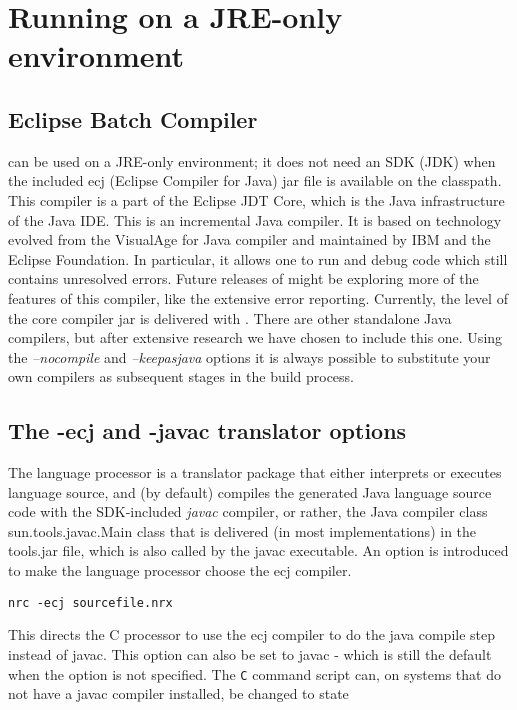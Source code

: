 \chapter{Running on a JRE-only environment\label{nosdk}}
 
\section{Eclipse Batch Compiler}
\nr{} can be used on a JRE-only environment; it  does not need an SDK (JDK) when the included ecj (Eclipse Compiler for Java) jar file is available on the classpath. This compiler is a part of the Eclipse JDT Core, which is the Java infrastructure of the Java IDE. This is an incremental Java compiler. It is based on technology evolved from the VisualAge for Java compiler and maintained by IBM and the Eclipse Foundation. In particular, it allows one to run and debug code which still contains unresolved errors. Future releases of \nr{} might be exploring more of the features of this compiler, like the extensive error reporting. Currently, the \ecjjarname{} level of the core compiler jar is delivered with \nr{}. There are other standalone Java compilers, but after extensive research we have chosen to include this one. Using the \emph{–nocompile} and \emph{–keepasjava} options it is always possible to substitute your own compilers as subsequent stages in the build process.
 
\section{The -ecj and -javac translator options}
The \nr{} language processor is a translator package that either interprets or executes \nr{} language source, and (by default) compiles the generated Java language source code with the SDK-included \emph{javac} compiler, or rather, the Java compiler class sun.tools.javac.Main class that is delivered (in most implementations) in the tools.jar file, which is also called by the javac executable. An option  is introduced to make the language processor choose the ecj compiler.
 
\begin{verbatim}
nrc -ecj sourcefile.nrx
\end{verbatim}
 
This directs the \nr{}C processor to use the ecj compiler to do the java compile step instead of javac. This option can also be set to javac - which is still the default when the option is not specified. The \texttt{\nr{}C} command script can, on systems that do not have a javac compiler installed, be changed to state
 
